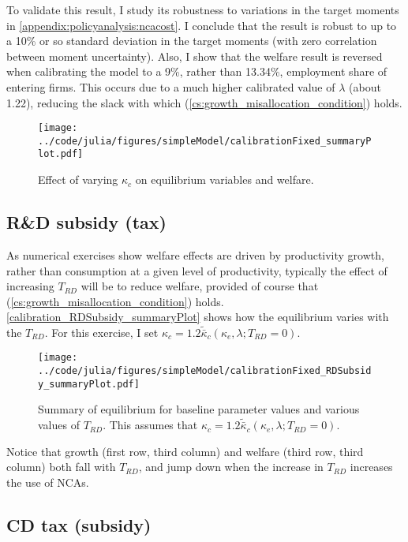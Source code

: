 \documentclass[11pt,english]{article}
\begin{document}
To validate this result, I study its robustness to variations in the target moments in \ref{appendix:policyanalysis:ncacost}. I conclude that the result is robust to up to a 10\% or so standard deviation in the target moments (with zero correlation between moment uncertainty). Also, I show that the welfare result is reversed when calibrating the model to a 9\%, rather than 13.34\%, employment share of entering firms. This occurs due to a much higher calibrated value of $\lambda$ (about 1.22), reducing the slack with which (\ref{cs:growth_misallocation_condition}) holds.  

\begin{figure}[]
	\texttt{[image: ../code/julia/figures/simpleModel/calibrationFixed\_summaryPlot.pdf]}
	\caption{Effect of varying $\kappa_c$ on equilibrium variables and welfare.}
	\label{calibration_summaryPlot}
\end{figure}

\subsection{R\&D subsidy (tax)}

As numerical exercises show welfare effects are driven by productivity growth, rather than consumption at a given level of productivity, typically the effect of increasing $T_{RD}$ will be to reduce welfare, provided of course that (\ref{cs:growth_misallocation_condition}) holds. \autoref{calibration_RDSubsidy_summaryPlot} shows how the equilibrium varies with the $T_{RD}$. For this exercise, I set $\kappa_c = 1.2 \tilde{\bar{\kappa}}_c(\kappa_e,\lambda;T_{RD} = 0)$. 

\begin{figure}[]
	\texttt{[image: ../code/julia/figures/simpleModel/calibrationFixed\_RDSubsidy\_summaryPlot.pdf]}
	\caption{Summary of equilibrium for baseline parameter values and various values of $T_{RD}$. This assumes that $\kappa_c = 1.2 \tilde{\bar{\kappa}}_c(\kappa_e,\lambda;T_{RD} = 0)$.}
	\label{calibration_RDSubsidy_summaryPlot}
\end{figure}

Notice that growth (first row, third column) and welfare (third row, third column) both fall with $T_{RD}$, and jump down when the increase in $T_{RD}$ increases the use of NCAs.


\subsection{CD tax (subsidy)}\label{subsec:cd_tax}
\end{document}
